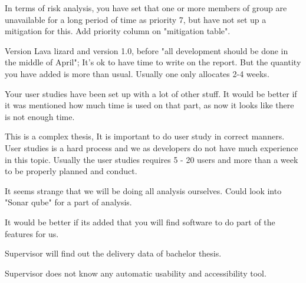 In terms of risk analysis, you have set that one or more members of group are unavailable for a long period of time as priority 7, but have not set up a mitigation for this. 
Add priority column on "mitigation table". 

Version Lava lizard and version 1.0, before "all development should be done in the middle of April"; It's ok to have time to write on the report. But the quantity you have added is more than usual. Usually one only allocates 2-4 weeks.

Your user studies have been set up with a lot of other stuff. It would be better if it was mentioned how much time is used on that part, as now it looks like there is not enough time.

This is a complex thesis, It is important to do user study in correct manners. User studies is a hard process and we as developers do not have much experience in this topic. Usually the user studies requires 5 - 20 users and more than a week to be properly planned and conduct.

It seems strange that we will be doing all analysis ourselves. Could look into "Sonar qube" for a part of analysis.

It would be better if its added that you will find software to do part of the features for us.

Supervisor will find out the delivery data of bachelor thesis.

Supervisor does not know any automatic usability and accessibility tool.

\newpage